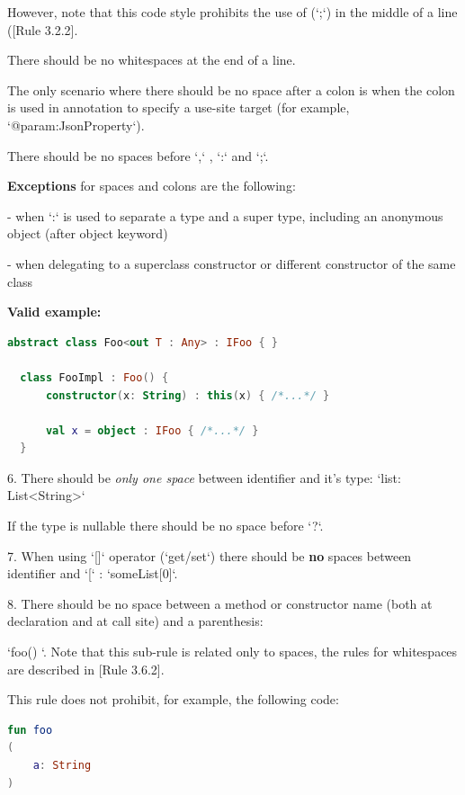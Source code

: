 {{{{    However, note that this code style prohibits the use of (`;`) in the middle of a line ([Rule 3.2.2].

    There should be no whitespaces at the end of a line.

    The only scenario where there should be no space after a colon is when the colon is used in annotation to specify a use-site target (for example, `@param:JsonProperty`).

    There should be no spaces before `,` , `:` and `;`. 

    \textbf{Exceptions} for spaces and colons are the following:

    

    - when `:` is used to separate a type and a super type, including an anonymous object (after object keyword)

    - when delegating to a superclass constructor or different constructor of the same class



\textbf{Valid example:}

\begin{lstlisting}[language=Kotlin]
  abstract class Foo<out T : Any> : IFoo { }
  
  class FooImpl : Foo() {
      constructor(x: String) : this(x) { /*...*/ }
      
      val x = object : IFoo { /*...*/ } 
  }
\end{lstlisting}


6. There should be \textit{only one space} between identifier and it's type: `list: List<String>`

If the type is nullable there should be no space before `?`.



7. When using `[]` operator (`get/set`) there should be \textbf{no} spaces between identifier and `[` : `someList[0]`.



8. There should be no space between a method or constructor name (both at declaration and at call site) and a parenthesis:

   `foo() {}`. Note that this sub-rule is related only to spaces, the rules for whitespaces are described in [Rule 3.6.2].

    This rule does not prohibit, for example, the following code:

\begin{lstlisting}[language=Kotlin]
fun foo
(
    a: String
)
\end{lstlisting}


}}}}
